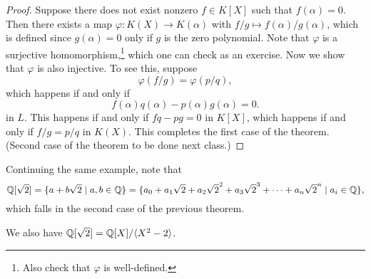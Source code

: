 \begin{proof}
  Suppose there does not exist nonzero $f \in K[X]$ such
  that $f(\alpha) = 0$. Then there exists a map
  $\varphi : K(X) \to K(\alpha)$ with
  $f / g \mapsto f(\alpha) / g(\alpha)$, which is
  defined since $g(\alpha) = 0$ only if $g$ is the
  zero polynomial. Note that $\varphi$ is a
  surjective homomorphism,\footnote{Also check that $\varphi$ is well-defined.} which one can check as
  an exercise. Now we show that $\varphi$ is also
  injective. To see this, suppose
  \[
    \varphi(f / g) = \varphi(p / q),
  \]
  which happens if and only if
  \[
    f(\alpha) q(\alpha) - p(\alpha) g(\alpha) = 0.
  \]
  in $L$. This happens if and only if $fq - pg = 0$
  in $K[X]$, which happens if and only if $f / g = p / q$
  in $K(X)$. This completes the first case of the theorem.
  (Second case of the theorem to be done next class.)
\end{proof}

\begin{example}
  Continuing the same example, note that
  \[
    \mathbb{Q}[\sqrt{2}] = \{a + b\sqrt{2} \mid a, b \in \mathbb{Q}\}
    = \{a_0 + a_1 \sqrt{2} + a_2 \sqrt{2}^2 + a_3 \sqrt{2}^3 + \dots + a_n \sqrt{2}^n \mid a_i \in \mathbb{Q}\},
  \]
  which falls in the second case of the previous theorem.
\end{example}

\begin{remark}
  We also have $\mathbb{Q}[\sqrt{2}] = \mathbb{Q}[X] / \langle X^2 - 2 \rangle$.
\end{remark}
